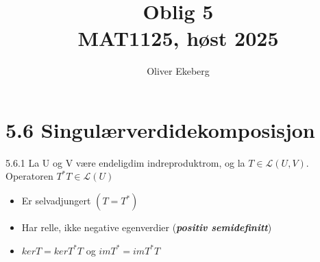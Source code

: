 \documentclass[a4paper,norsk]{article}
\title{Oblig 5 \\ MAT1125, høst 2025}
\author{Oliver Ekeberg}
\begin{document}
\maketitle

\tableofcontents


\section*{5.6 Singulærverdidekomposisjon}

\begin{lemmabox}{5.6.1}{}
    La U og V være endeligdim indreproduktrom, og la $ T \in \mathcal{L}(U, V) $. Operatoren $ T^*T \in \mathcal{L}(U) $
    
    \begin{itemize}
        \item Er selvadjungert $ \left( T = T^* \right)  $ 
        \item Har relle, ikke negative egenverdier (\textbf{\textit{positiv semidefinitt}})
        \item $ kerT = ker T^*T $ og $ imT^* = imT^*T $  
    \end{itemize}
\end{lemmabox}
\end{document}
